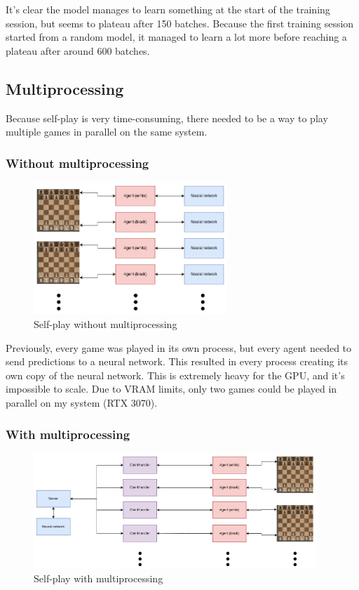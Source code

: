 \documentclass{article}
\begin{document}
It's clear the model manages to learn something at the start of the training session,
but seems to plateau after 150 batches. Because the first training session started from 
a random model, it managed to learn a lot more before reaching a plateau after around 600 batches.

\subsection{Multiprocessing}

Because self-play is very time-consuming, there needed to be a way to play multiple games in parallel 
on the same system.

\subsubsection{Without multiprocessing}

\begin{figure}[H]
    \centering
    \includegraphics[width=0.65\textwidth]{img/without-multiprocessing.png}
    \caption{Self-play without multiprocessing}
\end{figure}

Previously, every game was played in its own process, but every agent needed to send predictions to a neural network.
This resulted in every process creating its own copy of the neural network. This is extremely heavy for the GPU, and
it's impossible to scale. Due to VRAM limits, only two games could be played in parallel on my system (RTX 3070).

\subsubsection{With multiprocessing}

\begin{figure}[H]
    \centering
    \includegraphics[width=0.95\textwidth]{img/with-multiprocessing.png}
    \caption{Self-play with multiprocessing}
\end{figure}
\end{document}
